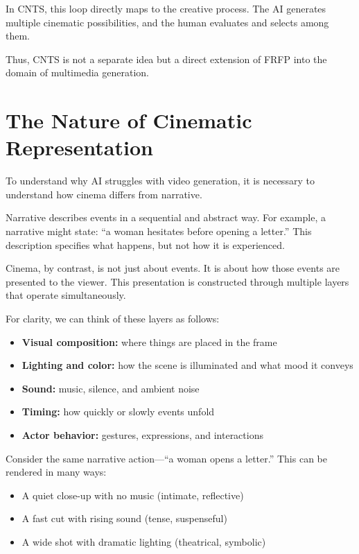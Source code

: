 \documentclass[preprints,article,submit,pdftex,moreauthors,accept]{Definitions/mdpi}
\begin{document}
In CNTS, this loop directly maps to the creative process. The AI generates multiple cinematic possibilities, and the human evaluates and selects among them.

Thus, CNTS is not a separate idea but a direct extension of FRFP into the domain of multimedia generation.

\section{The Nature of Cinematic Representation}

To understand why AI struggles with video generation, it is necessary to understand how cinema differs from narrative.

Narrative describes events in a sequential and abstract way. For example, a narrative might state: ``a woman hesitates before opening a letter.'' This description specifies what happens, but not how it is experienced.

Cinema, by contrast, is not just about events. It is about how those events are presented to the viewer. This presentation is constructed through multiple layers that operate simultaneously.

For clarity, we can think of these layers as follows:

\begin{itemize}
    \item \textbf{Visual composition:} where things are placed in the frame
    \item \textbf{Lighting and color:} how the scene is illuminated and what mood it conveys
    \item \textbf{Sound:} music, silence, and ambient noise
    \item \textbf{Timing:} how quickly or slowly events unfold
    \item \textbf{Actor behavior:} gestures, expressions, and interactions
\end{itemize}

Consider the same narrative action—``a woman opens a letter.'' This can be rendered in many ways:

\begin{itemize}
    \item A quiet close-up with no music (intimate, reflective)
    \item A fast cut with rising sound (tense, suspenseful)
    \item A wide shot with dramatic lighting (theatrical, symbolic)
\end{itemize}
\end{document}
